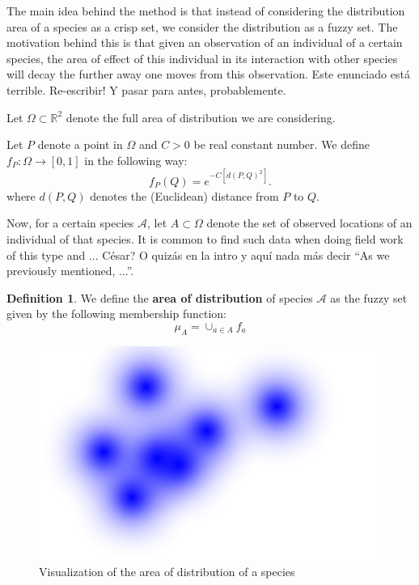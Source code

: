 \documentclass[12pt]{article}
\numberwithin{equation}{section} %
\numberwithin{figure}{section} %
\def\cA{{\mathcal{A}}}
\def\RR{{\mathbb{R}}}
\theoremstyle{definition}
\newtheorem{definition}[theorem]{Definition}
\def\tcr#1{\textcolor{MyRed}{#1}}
\begin{document}
The main idea behind the method is that instead of considering the distribution area of a species as a crisp set, we consider the distribution as a fuzzy set. The motivation behind this is that given an observation of an individual of a certain species, the area of effect of this individual in its interaction with other species will decay the further away one moves from this observation. \tcr{Este enunciado está terrible. Re-escribir! Y pasar para antes, probablemente.}

Let $\Omega \subset \RR^2$ denote the full area of distribution we are considering.

Let $P$ denote a point in $\Omega$ and $C > 0$ be real constant number. We define $f_P:\Omega \to [0,1]$ in the following way:
	$$f_P(Q) = e^{-C\left[d(P,Q)^2\right]}.$$
	where $d(P,Q)$ denotes the (Euclidean) distance from $P$ to $Q$.

	Now, for a certain species $\cA$, let $A \subset \Omega$ denote the set of observed locations of an individual of that species. It is common to find such data when doing field work of this type and ... \tcr{César? O quizás en la intro y aquí nada más decir ``As we previously mentioned, ...''}.

  \begin{definition}
	We define the \textbf{area of distribution} of species $\cA$ as the fuzzy set given by the following membership function:
		$$\mu_A = \cup_{a\in A} f_a$$
  \end{definition}
  
	\begin{figure}
	\begin{center}
		\includegraphics[scale=0.35]{./distribucion.png}
		\caption{Visualization of the area of distribution of a species}
	\end{center}
	
	\end{figure}
	
\end{document}
